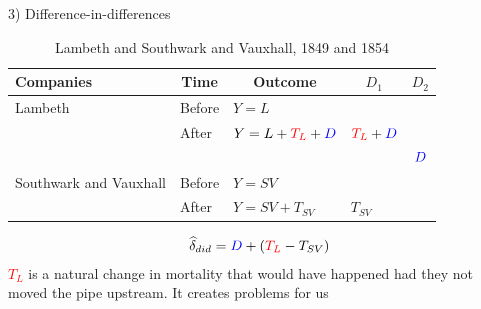 \documentclass{beamer}
\begin{document}
\begin{frame}{3) Difference-in-differences}

\begin{table}\centering
		\caption{Lambeth and Southwark and Vauxhall, 1849 and 1854}
		\begin{center}
		\begin{tabular}{lll|lc}
		\toprule
		\multicolumn{1}{l}{\textbf{Companies}}&
		\multicolumn{1}{c}{\textbf{Time}}&
		\multicolumn{1}{c}{\textbf{Outcome}}&
		\multicolumn{1}{c}{$D_1$}&
		\multicolumn{1}{c}{$D_2$}\\
		\midrule
		Lambeth & Before & $Y=L$ \\
		& After & $Y=L + \textcolor{red}{T_L} + \textcolor{blue}{D}$ & $\textcolor{red}{T_L}+\textcolor{blue}{D}$\\
		\midrule
		& & & & $\textcolor{blue}{D}$ \\
		\midrule
		Southwark and Vauxhall & Before & $Y=SV$ \\
		& After & $Y=SV + T_{SV}$ & $T_{SV}$\\
		\bottomrule
		\end{tabular}
		\end{center}
	\end{table}

\begin{eqnarray*}
\widehat{\delta}_{did} = \textcolor{blue}{D} + (\textcolor{red}{T_L} - T_{SV})
\end{eqnarray*}\textcolor{red}{$T_L$} is a natural change in mortality that would have happened had they not moved the pipe upstream.  It creates problems for us

\end{frame}
\end{document}
